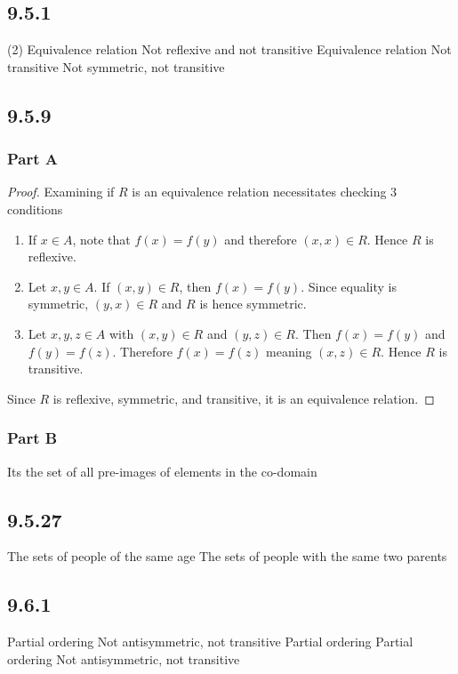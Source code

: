 \documentclass[12pt,titlepage]{extarticle}
\begin{document}
\subsection*{9.5.1}
\begin{tasks}(2)
    \task Equivalence relation
    \task Not reflexive and not transitive
    \task Equivalence relation
    \task Not transitive
    \task Not symmetric, not transitive
\end{tasks}

\subsection*{9.5.9}
\subsubsection*{Part A}
\begin{proof}
    Examining if $R$ is an equivalence relation necessitates checking 3 conditions
    \begin{enumerate}
        \item If $x \in A$, note that $f(x) = f(y)$ and therefore $(x,x) \in R$. Hence $R$ is reflexive.
        \item Let $x,y \in A$. If $(x,y) \in R$, then $f(x) = f(y)$. Since equality is symmetric, $(y,x) \in R$ and $R$ is hence symmetric.
        \item Let $x,y,z \in A$ with $(x,y) \in R$ and $(y,z) \in R$. Then $f(x) = f(y)$ and $f(y) = f(z)$. Therefore $f(x) = f(z)$ meaning $(x,z) \in R$. Hence $R$ is transitive.
    \end{enumerate}
    Since $R$ is reflexive, symmetric, and transitive, it is an equivalence relation.
\end{proof}

\subsubsection*{Part B}
Its the set of all pre-images of elements in the co-domain

\subsection*{9.5.27}
\begin{tasks}
    \task The sets of people of the same age 
    \task The sets of people with the same two parents
\end{tasks}

\subsection*{9.6.1}
\begin{tasks}
    \task Partial ordering
    \task Not antisymmetric, not transitive
    \task Partial ordering
    \task Partial ordering
    \task Not antisymmetric, not transitive
\end{tasks}
\end{document}
